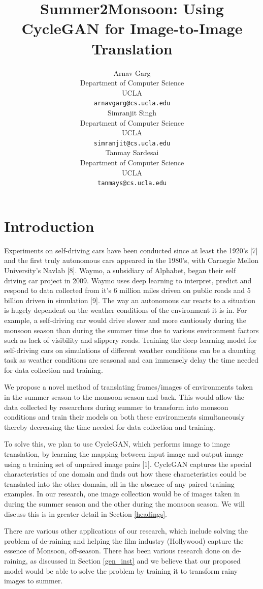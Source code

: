 \documentclass{article}
\title{Summer2Monsoon: Using CycleGAN for Image-to-Image Translation}
\author{
  Arnav Garg \\
  Department of Computer Science\\
  UCLA\\
  \texttt{arnavgarg@cs.ucla.edu} \\
  \And
  Simranjit Singh \\
  Department of Computer Science\\
  UCLA\\
  \texttt{simranjit@cs.ucla.edu} \\
   \And
  Tanmay Sardesai \\
  Department of Computer Science\\
  UCLA\\
  \texttt{tanmays@cs.ucla.edu} \\
}
\begin{document}

\maketitle
\section{Introduction}

Experiments on self-driving cars have been conducted since at least the 1920’s [7]
and the first truly autonomous cars appeared in the 1980’s, with Carnegie 
Mellon University’s Navlab [8]. Waymo, a subsidiary of Alphabet, 
began their self driving car project in 2009. Waymo uses deep learning 
to interpret, predict and respond to data collected from it’s 6 million 
miles driven on public roads and 5 billion driven in simulation [9]. 
The way an autonomous car reacts to a situation is hugely dependent on 
the weather conditions of the environment it is in. For example, a 
self-driving car would drive slower and more cautiously during the 
monsoon season than during the summer time due to various environment
 factors such as lack of visibility and slippery roads. 
 Training the deep learning model for self-driving cars on 
 simulations of different weather conditions can be a daunting 
 task as weather conditions are seasonal and can immensely delay 
 the time needed for data collection and training.

We propose a novel method of translating frames/images of environments 
taken in the summer season to the monsoon season and back. 
This would allow the data collected by researchers during 
summer to transform into monsoon conditions and train their 
models on both these environments simultaneously thereby 
decreasing the time needed for data collection and training.

To solve this, we plan to use CycleGAN, which performs image to image 
translation, by learning the mapping between input image and output image 
using a training set of unpaired image pairs [1]. CycleGAN captures the 
special characteristics of one domain and finds out how these 
characteristics could be translated into the other domain, all in the 
absence of any paired training examples. In our research, one image 
collection would be of images taken in during the summer season and 
the other during the monsoon season. We will discuss this is in greater 
detail in Section \ref{headings}.  

There are various other applications of our research, which include 
solving the problem of de-raining and helping the film industry (Hollywood)
 capture the essence of Monsoon, off-season. There has been various research 
 done on de-raining, as discussed in Section \ref{gen_inst} and we believe that our 
 proposed model would be able to solve the problem by training it to 
 transform rainy images to summer.
\end{document}
